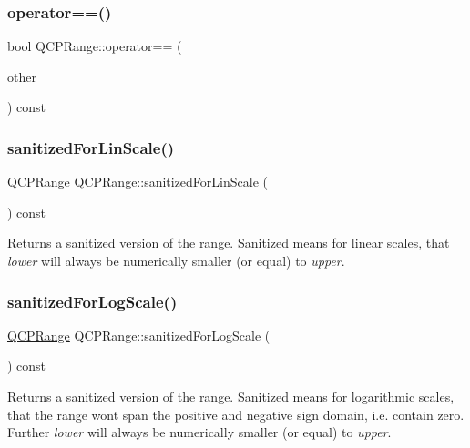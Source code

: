\subsubsection{\texorpdfstring{operator==()}{operator==()}}
{\footnotesize\ttfamily bool Q\+C\+P\+Range\+::operator== (\begin{DoxyParamCaption}\item[{const \mbox{\hyperlink{class_q_c_p_range}{Q\+C\+P\+Range}} \&}]{other }\end{DoxyParamCaption}) const\hspace{0.3cm}{\ttfamily [inline]}}

\mbox{\label{class_q_c_p_range_a808751fdd9b17ef52327ba011df2e5f1}} 
\subsubsection{\texorpdfstring{sanitizedForLinScale()}{sanitizedForLinScale()}}
{\footnotesize\ttfamily \mbox{\hyperlink{class_q_c_p_range}{Q\+C\+P\+Range}} Q\+C\+P\+Range\+::sanitized\+For\+Lin\+Scale (\begin{DoxyParamCaption}{ }\end{DoxyParamCaption}) const}

Returns a sanitized version of the range. Sanitized means for linear scales, that {\itshape lower} will always be numerically smaller (or equal) to {\itshape upper}. \mbox{\label{class_q_c_p_range_a3d66288d66e1d6df3636075eb42502ee}} 
\subsubsection{\texorpdfstring{sanitizedForLogScale()}{sanitizedForLogScale()}}
{\footnotesize\ttfamily \mbox{\hyperlink{class_q_c_p_range}{Q\+C\+P\+Range}} Q\+C\+P\+Range\+::sanitized\+For\+Log\+Scale (\begin{DoxyParamCaption}{ }\end{DoxyParamCaption}) const}

Returns a sanitized version of the range. Sanitized means for logarithmic scales, that the range won\textquotesingle{}t span the positive and negative sign domain, i.\+e. contain zero. Further {\itshape lower} will always be numerically smaller (or equal) to {\itshape upper}.

